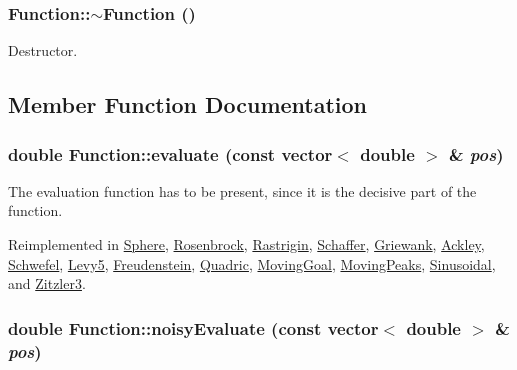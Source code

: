 \hypertarget{classFunction_3b03f7cf0b75d16edebdda1dee1db6fd}{
\subsubsection{\setlength{\rightskip}{0pt plus 5cm}Function::$\sim$Function ()}}
\label{classFunction_3b03f7cf0b75d16edebdda1dee1db6fd}


Destructor. 



\subsection{Member Function Documentation}
\hypertarget{classFunction_159260a1fc3afa8932491e4057b6b844}{
\subsubsection{\setlength{\rightskip}{0pt plus 5cm}double Function::evaluate (const vector$<$ double $>$ \& {\em pos})}}
\label{classFunction_159260a1fc3afa8932491e4057b6b844}


The evaluation function has to be present, since it is the decisive part of the function. 



Reimplemented in \hyperlink{classSphere_e4d2bfab43d39524dfe3421d76d66f5f}{Sphere}, \hyperlink{classRosenbrock_2f19302aa06dd22a427291ed3af6ce1c}{Rosenbrock}, \hyperlink{classRastrigin_2b969cef4e9fe1a82e6550ab2cb74bd1}{Rastrigin}, \hyperlink{classSchaffer_7112daf77ee0a64dab7c86de90a534dd}{Schaffer}, \hyperlink{classGriewank_05917918e68b34e9ed3e794388975f6c}{Griewank}, \hyperlink{classAckley_bfd43046b591f73cf05527333220b5e2}{Ackley}, \hyperlink{classSchwefel_127479ba86b2a029c9f6811cf21faff2}{Schwefel}, \hyperlink{classLevy5_ac62f31602725e819687853a95068331}{Levy5}, \hyperlink{classFreudenstein_0ab476b270de17051b8d8c1174c1990d}{Freudenstein}, \hyperlink{classQuadric_897b3e96e1f1223bf0b2b9fdce32698d}{Quadric}, \hyperlink{classMovingGoal_495b2d42c272fb2a941792e67c8c79c4}{MovingGoal}, \hyperlink{classMovingPeaks_6f7165d8ab1b805ff2e3b6cb3df8b7f3}{MovingPeaks}, \hyperlink{classSinusoidal_ebf69635314532d341503d97b09e7c39}{Sinusoidal}, and \hyperlink{classZitzler3_1a6ae3e995a89c472fcea592e0fb7d67}{Zitzler3}.\hypertarget{classFunction_ee755167a250e9bfea3148396a7865d2}{
\subsubsection{\setlength{\rightskip}{0pt plus 5cm}double Function::noisyEvaluate (const vector$<$ double $>$ \& {\em pos})}}
\label{classFunction_ee755167a250e9bfea3148396a7865d2}



